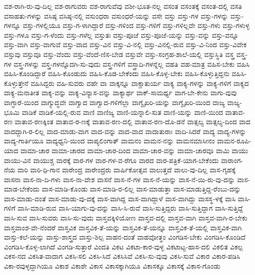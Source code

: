 ವಶ-ರಾಗಿ-ರು-ವು-ದಿಲ್ಲ
ವಶ-ರಾಗುವರು
ವಶ-ರಾಗುವೆವು
ವಶೀ-ಭೂತ-ನಲ್ಲ
ವಸಂತ
ವಸಂತಕ್ಕೆ
ವಸಂತ-ದಲ್ಲಿ
ವಸತಿ
ವಸಾಹತು-ಗಳನ್ನು
ವಸಿಷ್ಠ
ವಸಿಷ್ಠ-ನಲ್ಲಿ
ವಸುಂಧರಾ
ವಸುಂಧರೆ-ಯನ್ನು
ವಸೇ
ವಸ್ತು
ವಸ್ತು-ಗಳ
ವಸ್ತು-ಗಳನ್ನು
ವಸ್ತು-ಗಳನ್ನೂ
ವಸ್ತು-ಗಳಲ್ಲಿಯೂ
ವಸ್ತು-ಗ-ಳಾಗಿದ್ದಾರೆ
ವಸ್ತು-ಗಳಿಂದ
ವಸ್ತು-ಗಳಿಗೆ
ವಸ್ತು-ಗಳಿಲ್ಲವೇ
ವಸ್ತು-ಗಳು
ವಸ್ತು-ಗಳುಳ್ಳ
ವಸ್ತು-ಗಳೂ
ವಸ್ತು-ಗ-ಳೆಂದು
ವಸ್ತು-ಗಳೆಲ್ಲ
ವಸ್ತುತಃ
ವಸ್ತು-ಪೂಜೆ
ವಸ್ತು-ಪೂಜೆ-ಯನ್ನು
ವಸ್ತು-ವನ್ನು
ವಸ್ತು-ವನ್ನೂ
ವಸ್ತು-ವಾಗಿ
ವಸ್ತು-ವಾಗುವೆ
ವಸ್ತು-ವಾದ
ವಸ್ತು-ವಿನ
ವಸ್ತು-ವಿ-ನಲ್ಲಿ
ವಸ್ತು-ವಿನಲ್ಲಿ-ರುವ
ವಸ್ತು-ವಿ-ನಿಂದ
ವಸ್ತು-ವಿವೇಕ
ವಸ್ತುವು
ವಸ್ತುವೂ
ವಸ್ತು-ವೆಂದು
ವಸ್ತು-ವೆಂದೆ-ಣಿಸ-ಬೇಡ
ವಸ್ತುವೇ
ವಸ್ತು-ಸಂಗ್ರಹ-ಶಾಲೆ-ಯಲ್ಲಿ
ವಸ್ತುಸ್ಥಿತಿ
ವಸ್ತ್ರ
ವಸ್ತ್ರ-ಗಳ
ವಸ್ತ್ರ-ಗಳನ್ನು
ವಸ್ತ್ರ-ಗಳನ್ನೊದಗಿ-ಸು-ವುದು
ವಸ್ತ್ರ-ಗಳಿಗೆ
ವಸ್ತ್ರಾದಿ-ಗಳನ್ನೆಲ್ಲ
ವಹತಿ
ವಹ-ಮಾತ್ರ
ವಹಿಸ-ಬೇಕು
ವಹಿಸಿ
ವಹಿಸಿ-ಕೊಂಡಿದ್ದಾರೆ
ವಹಿಸಿ-ಕೊಂಡುದು
ವಹಿಸಿ-ಕೊಡ-ಬೇಕೆಂದು
ವಹಿಸಿ-ಕೊಳ್ಳ-ಬೇಕು
ವಹಿಸಿ-ಕೊಳ್ಳುತ್ತಿದ್ದನು
ವಹಿಸಿ-ಕೊಳ್ಳುತ್ತೇನೆ
ವಹಿಸಿದ್ದರು
ವಹಿ-ಸುವರು
ವಹೇ
ವಾ
ವಾಕ್ಕನ್ನೂ
ವಾಕ್ಚಾತುರ್ಯ
ವಾಕ್ಯ
ವಾಕ್ಯ-ಗಳನ್ನು
ವಾಕ್ಯ-ಗಳಿಗೆ
ವಾಕ್ಯದ
ವಾಕ್ಯ-ಮನಾತೀತ
ವಾಕ್ಯ-ವನ್ನು
ವಾಕ್ಯ-ವಿನ್ಯಾಸ-ವನ್ನು
ವಾಕ್ಯಾರ್ಥ
ವಾಕ್‌-ಸಾಮರ್ಥ್ಯ
ವಾಗ-ಬೇ-ಕೇನು
ವಾಗು-ವುವು
ವಾಗ್ಧಾರೆ-ಯಿಂದ
ವಾಗ್ಯುದ್ಧವೇ
ವಾಗ್ವಾದ
ವಾಗ್ವಾದ-ಗಳಿಗೆಲ್ಲಾ
ವಾಗ್ವೈಖರಿ-ಯನ್ನು
ವಾಗ್ವೈಖರಿ-ಯಿಂದ
ವಾಜ್ಯ
ವಾಜ್ಯ-ಭೂಮಿ
ವಾಡಿಕೆ
ವಾಡಿಕೆ-ಯಲ್ಲಿ-ರುವ
ವಾಣಿ
ವಾಣಿಜ್ಯ
ವಾಣಿ-ಯನ್ನಾಲಿ-ಸುತ
ವಾಣಿ-ಯನ್ನು
ವಾಣಿ-ಯಿಂದ
ವಾತಾವ-ರಣ
ವಾತಾವ-ರಣಕ್ಕಿಂತ
ವಾತಾವ-ರ-ಣಕ್ಕೆ
ವಾತಾವ-ರಣ-ದಲ್ಲಿ
ವಾತಾವ-ರಣ-ದೊ-ಡನೆ
ವಾತ್ಸಲ್ಯ
ವಾತ್ಸಲ್ಯ-ದಿಂದ
ವಾದ
ವಾದದ್ದಾಗಿ-ರ-ಲಿಲ್ಲ
ವಾದ-ಮಾಡು-ವಾಗ
ವಾದ-ವನ್ನು
ವಾದ-ವಾದ
ವಾದಾತುರಾಃ
ವಾದಿ-ಸಿದರೆ
ವಾದ್ಯ
ವಾದ್ಯ-ಗಳನ್ನು
ವಾದ್ಯ-ಗಾರ್ತಿಯೂ
ವಾದ್ಯಧ್ವನಿ-ಯಿಂದ
ವಾಪ್ಯಲಿಂಗಾತ್
ವಾಮನಂ
ವಾಮನ-ನನ್ನು
ವಾಮನಮಾಸೀನಂ
ವಾಮನ-ರೂಪಿ-ಯಾದ
ವಾಮಾ-ಚಾರ
ವಾಮಾ-ಚಾರದ
ವಾಮಾ-ಚಾರ-ದಿಂದ
ವಾಮಾ-ಚಾರ-ವನ್ನು
ವಾಮಾ-ಚಾರವೂ
ವಾಮಿ
ವಾಯು
ವಾಯು-ವಿನ
ವಾಯುಶ್ಚ
ವಾರಕ್ಕೆ
ವಾರ-ಗಳ
ವಾರ-ಗಳ-ವ-ರೆಗೂ
ವಾರದ
ವಾರ-ಪತ್ರಿಕೆ-ಯಾಗ-ಬೇಕೆಂದು
ವಾರಾಂಗ-ನೆಯ
ವಾರಿ
ವಾರಿ-ಧಿ-ಗಾನ
ವಾರೇಂದ್ರ
ವಾರೇಂದ್ರರು
ವಾರ್ಷಿಕೋತ್ಸವ
ವಾಲುತ್ತದೆ
ವಾಲು-ವು-ದಿಲ್ಲ
ವಾಸ-ಗೃಹಕ್ಕೆ
ವಾಸನಾ
ವಾಸ-ನಾ-ದಿ-ಗಳು
ವಾಸ-ನಾ-ವೇಶ
ವಾಸನೆ
ವಾಸ-ನೆ-ಗಳ
ವಾಸ-ನೆ-ಯನ್ನು
ವಾಸ-ನೆ-ಯಿ-ರು-ವು-ದನ್ನು
ವಾಸ-ಮಾಡ-ಬೇಕೆಂದು
ವಾಸ-ಮಾಡಿ-ಕೊಂಡು
ವಾಸ-ಮಾಡಿ-ರ-ಲಿಲ್ಲ
ವಾಸ-ಮಾಡುತ್ತಾ
ವಾಸ-ಮಾಡುತ್ತಿದ್ದ-ರೆಂಬು-ದನ್ನು
ವಾಸ-ಮಾಡು-ವಂತೆ
ವಾಸ-ಮಾಡು-ವು-ದಕ್ಕೆ
ವಾಸ-ವಾಗಿದ್ದ
ವಾಸ-ವಾಗಿದ್ದಾಳೆ
ವಾಸ-ವಾಗಿದ್ದು
ವಾಸಸ್ಥ-ಳಕ್ಕೆ
ವಾಸಿ
ವಾಸಿ-ಗಳಿಗೆ
ವಾಸಿ-ಮಾಡಿ-ರುವ
ವಾಸಿ-ಯಾಗು-ವು-ದನ್ನು
ವಾಸಿ-ಸಿ-ರುವೆ
ವಾಸಿ-ಸುತ್ತಿದ್ದರು
ವಾಸಿ-ಸುತ್ತಿದ್ದಾಗ
ವಾಸಿ-ಸುತ್ತಿದ್ದೆ
ವಾಸಿ-ಸುವ
ವಾಸಿ-ಸುವರು
ವಾಸಿ-ಸು-ವುದು
ವಾಸ್ತವಕ್ಕಿಳಿಯೋಣ
ವಾಸ್ತವ-ದಲ್ಲಿ
ವಾಸ್ತವ-ವಾಗಿ
ವಾಸ್ತವ-ವಾಗಿ-ರ-ಬೇಕು
ವಾಸ್ತವಾಂಶ-ವೇ-ನೆಂದರೆ
ವಾಸ್ತವಿಕ
ವಾಸ್ತವಿಕ-ತೆ-ಯನ್ನು
ವಾಸ್ತವಿಕ-ತೆ-ಯನ್ನೂ
ವಾಸ್ತವಿಕ-ತೆ-ಯಲ್ಲಿ
ವಾಸ್ತವಿಕ-ವಾಗಿ
ವಾಸ್ತು-ಕಲೆ-ಯನ್ನು
ವಾಸ್ತು-ಶಾಸ್ತ್ರದ
ವಾಸ್ತು-ಶಿಲ್ಪ
ವಾಹನ-ದಂತೆ
ವಾಹವೋತ್ಥಂ
ವಿಂಗಡಿಸ-ಬೇಕು
ವಿಂಗಡಿಸಿ-ಕೊಂಡಿದೆ
ವಿಂಗಡಿಸಿ-ಕೊಳ್ಳ-ಲಾಗಿದೆ
ವಿಂಗಡಿ-ಸುತ್ತಾರೆ
ವಿಂದತಿ
ವಿಕಟ
ವಿಕಟಾ-ಕಾರ-ವುಳ್ಳ
ವಿಕಟಾಟ್ಟ-ಹಾಸ-ದಲಿ
ವಿಕಲಿತ
ವಿಕಲ್ಪ
ವಿಕಸ-ನದ
ವಿಕಸಿತ-ವಾದಾಗ
ವಿಕಸಿ-ಸಲಿ
ವಿಕಸಿ-ಸಿದೆ
ವಿಕಸಿಸಿವೆ
ವಿಕಸಿ-ಸು-ವುವು
ವಿಕಸಿ-ಸುವೆ
ವಿಕಾರ
ವಿಕಾರ-ಪಡಿಸಿ
ವಿಕಾ-ರವುಳ್ಳದ್ದಾಗಿಯೂ
ವಿಕಾಶ
ವಿಕಾಶೇ
ವಿಕಾಸ
ವಿಕಾಸಕ್ಕಾಗಿಯೂ
ವಿಕಾಸಕ್ಕೂ
ವಿಕಾಸಕ್ಕೆ
ವಿಕಾಸ-ಗೊಂಡು
